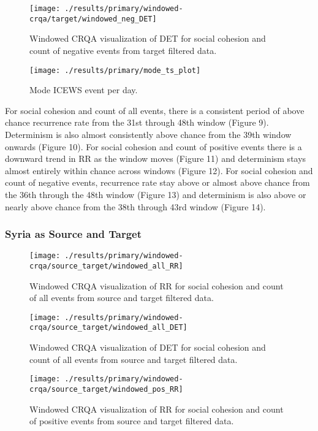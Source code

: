 \documentclass[english,man]{apa6}
\begin{document}
\begin{figure}
\texttt{[image: ./results/primary/windowed-crqa/target/windowed\_neg\_DET]} \caption{Windowed CRQA visualization of DET for social cohesion and count of negative events from target filtered data.}\label{fig:plot-DET-targ-neg}
\end{figure}

\begin{figure}
\texttt{[image: ./results/primary/mode\_ts\_plot]} \caption{Mode ICEWS event per day.}\label{fig:plot-mode-event}
\end{figure}

For social cohesion and count of all events, there is a consistent period of above chance recurrence rate from the 31st through 48th window (Figure 9). Determinism is also almost consistently above chance from the 39th window onwards (Figure 10). For social cohesion and count of positive events there is a downward trend in RR as the window moves (Figure 11) and determinism stays almost entirely within chance across windows (Figure 12). For social cohesion and count of negative events, recurrence rate stay above or almost above chance from the 36th through the 48th window (Figure 13) and determinism is also above or nearly above chance from the 38th through 43rd window (Figure 14).

\hypertarget{syria-as-source-and-target-1}{%
\subsubsection{Syria as Source and Target}\label{syria-as-source-and-target-1}}

\begin{figure}
\texttt{[image: ./results/primary/windowed-crqa/source\_target/windowed\_all\_RR]} \caption{Windowed CRQA visualization of RR for social cohesion and count of all events from source and target filtered data.}\label{fig:plot-RR-source-targ-all}
\end{figure}

\begin{figure}
\texttt{[image: ./results/primary/windowed-crqa/source\_target/windowed\_all\_DET]} \caption{Windowed CRQA visualization of DET for social cohesion and count of all events from source and target filtered data.}\label{fig:plot-DET-source-targ-all}
\end{figure}

\begin{figure}
\texttt{[image: ./results/primary/windowed-crqa/source\_target/windowed\_pos\_RR]} \caption{Windowed CRQA visualization of RR for social cohesion and count of positive events from source and target filtered data.}\label{fig:plot-RR-source-targ-pos}
\end{figure}
\end{document}

